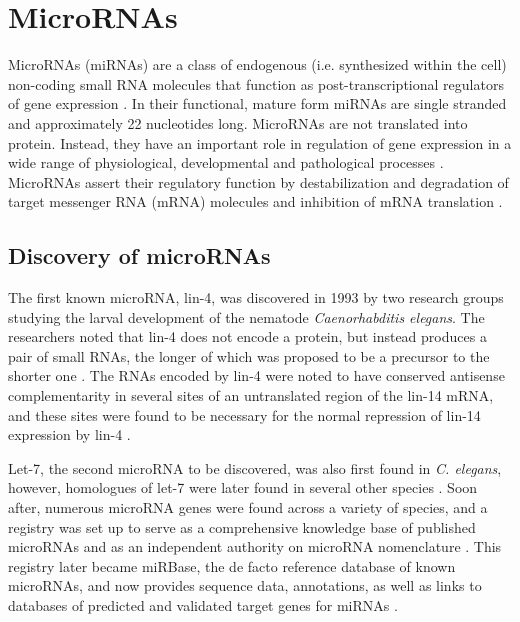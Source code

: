 
\section{MicroRNAs}\label{micrornas}

MicroRNAs (miRNAs) are a class of endogenous (i.e. synthesized within the
cell) non-coding small RNA molecules that function as post-transcriptional
regulators of gene expression \citep{Ambros2004}. In their
functional, mature form miRNAs are single stranded and approximately 22
nucleotides long. MicroRNAs are not translated into protein. Instead, they
have an important role in regulation of gene expression in a wide range of
physiological, developmental and pathological processes \citep{Bartel2009}.
MicroRNAs assert their regulatory function by destabilization and degradation
of target messenger RNA (mRNA) molecules and inhibition of mRNA translation
\citep{Fabian2010}.




\subsection{Discovery of microRNAs}

The first known microRNA, lin-4, was discovered in 1993 by two research groups
studying the larval development of the nematode \emph{Caenorhabditis elegans}.
The researchers noted that lin-4 does not encode a protein, but instead
produces a pair of small RNAs, the longer of which was proposed to be a
precursor to the shorter one \citep{Lee1993}. The RNAs encoded by lin-4 were
noted to have conserved antisense complementarity in several sites of an
untranslated region of the lin-14 mRNA, and these sites were found to be
necessary for the normal repression of lin-14 expression by lin-4
\citep{Lee1993,Wightman1993}.

Let-7, the second microRNA to be discovered, was also first found in \emph{C.
elegans}, however, homologues of let-7 were later found in several other
species \citep{Pasquinelli2000}. Soon after, numerous microRNA genes were found across
a variety of species, and a registry was set up to serve as a comprehensive
knowledge base of published microRNAs and as an independent authority on
microRNA nomenclature \citep{GriffithsJones2004}. This registry later became
miRBase, the de facto reference database of known microRNAs, and now provides
sequence data, annotations, as well as links to databases of predicted and
validated target genes for miRNAs \citep{Kozomara2014}.




